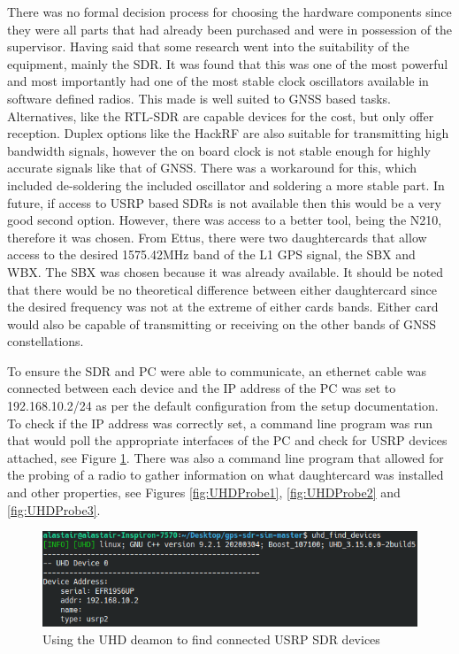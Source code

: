 There was no formal decision process for choosing the hardware components since they were all parts that had already been purchased and were in possession of the
supervisor. Having said that some research went into the suitability of the equipment, mainly the SDR. It was found that this was one of the most powerful and most
importantly had one of the most stable clock oscillators available in software defined radios. This made is well suited to GNSS based tasks. Alternatives, like the
RTL-SDR are capable devices for the cost, but only offer reception. Duplex options like the HackRF are also suitable for transmitting high bandwidth signals, however the
on board clock is not stable enough for highly accurate signals like that of GNSS. There was a workaround for this, which included de-soldering the included oscillator and
soldering a more stable part. In future, if access to USRP based SDRs is not available then this would be a very good second option. However, there was access to a better
tool, being the N210, therefore it was chosen. From Ettus, there were two daughtercards that allow access to the desired 1575.42MHz band of the L1 GPS signal, the SBX and
WBX. The SBX was chosen because it was already available. It should be noted that there would be no theoretical difference between either daughtercard since the desired
frequency was not at the extreme of either cards bands. Either card would also be capable of transmitting or receiving on the other bands of GNSS constellations.

To ensure the SDR and PC were able to communicate, an ethernet cable was connected between each device and the IP address of the PC was set to 192.168.10.2/24 as per the
default configuration from the setup documentation. To check if the IP address was correctly set, a command line program was run that would poll the appropriate
interfaces of the PC and check for USRP devices attached, see Figure \ref{fig:UHDFind}. There was also a command line program that allowed for the probing of a
radio to gather information on what daughtercard was installed and other properties, see Figures \ref{fig:UHDProbe1}, \ref{fig:UHDProbe2} and \ref{fig:UHDProbe3}.

\begin{figure}[!h]
    \begin{centering}
        \includegraphics[width=14cm,keepaspectratio]{Figures/uhd-find-devices.png}
        \caption{Using the UHD deamon to find connected USRP SDR devices}
    \label{fig:UHDFind}
    \end{centering}
\end{figure}

